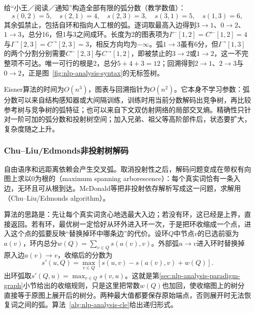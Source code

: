 给“小王／阅读／通知”构造全部有限的弧分数（教学数值）：
\[
 s(0,2)=5,\quad s(2,1)=4,\quad s(2,3)=3,\quad
 s(3,1)=5,\quad s(1,3)=6,
\]
其余弧禁止，包括自环和指向人工根的弧。逐词取最高入边得到$3\to1$、$0\to2$、$1\to3$，总分16，但1与3之间成环。长度为2的图表项为$I^{\leftarrow}[1,2]=C^{\leftarrow}[1,2]=4$与$I^{\to}[2,3]=C^{\to}[2,3]=3$，相反方向均为$-\infty$。弧$1\to3$虽有6分，但$I^{\to}[1,3]$的两个分割分别需要$C^{\leftarrow}[2,3]$与$C^{\to}[1,2]$，即被禁止的$3\to2$或$1\to2$，这一不完整项不可达。唯一可行的根是2，总分$5+4+3=12$；回溯得到$2\to1$、$2\to3$与$0\to2$，正是图~\ref{fig:nlp-analysis-syntax}的无标签树。

Eisner算法的时间为$O(n^3)$，图表与回溯指针为$O(n^2)$。它本身不学习参数：弧分数可以来自结构感知器或大间隔训练\cite{mcdonald-etal-2005-non}，训练时用当前分数解码出竞争树，再比较参考树与竞争树的弧特征；也可以来自下文双仿射网络的局部交叉熵。精确性只针对一阶可加的弧分数和投射树空间；加入兄弟、祖父等高阶部件后，状态要扩大，复杂度随之上升。

\subsubsection{Chu--Liu/Edmonds非投射树解码}
\label{sec:nlp-analysis-mst}

自由语序和远距离依赖会产生交叉弧。取消投射性之后，解码问题变成在带权有向图上求以0为根的（maximum spanning arborescence）：每个真实词恰有一条入边，无环且可从根到达。McDonald等把非投射依存解析写成这一问题\cite{v9a-mcdonald2005}，求解用（Chu--Liu/Edmonds algorithm）。

算法的思路是：先让每个真实词贪心地选最大入边；若没有环，这已经是上界，直接返回。若有环，最优树一定恰好从环外进入环一次，于是把环收缩成一个点，进入这个点的弧要反映“替换掉环中哪条边”的代价。设环$Q$中节点$v$的已选前驱为$a(v)$，环内总分$w(Q)=\sum_{v\in Q}s(a(v),v)$。外部弧$u\to v$进入环时替换掉原入边$a(v)\to v$，收缩后的分数为
\begin{equation}
 s'(u,Q)=\max_{v\in Q}
   [s(u,v)-s(a(v),v)+w(Q)].
 \label{eq:nlp-analysis-mst-contract}
\end{equation}
出环弧取$s'(Q,u)=\max_{v\in Q}s(v,u)$。这就是第\ref{sec:nlp-analysis-paradigm-graph}小节给出的收缩规则，只是这里把常数$w(Q)$也加回，使收缩图上的树分直接等于原图上展开后的树分。两种最大值都要保存原始端点，否则展开时无法恢复词之间的弧。算法~\ref{alg:nlp-analysis-cle}给出递归形式。

